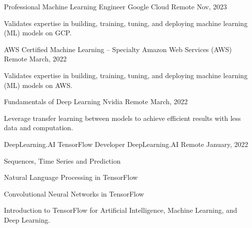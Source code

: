 

\begin{cventries}
  \cventry
  {Professional Machine Learning Engineer} %
  {Google Cloud} %
  {Remote} %
  {Nov, 2023} %
  {
    \begin{cvitems} %
      \item {Validates expertise in building, training, tuning, and deploying machine learning (ML) models on GCP.}
    \end{cvitems}
  } %
  \newline
  \cventry
  {AWS Certified Machine Learning – Specialty} %
  {Amazon Web Services (AWS)} %
  {Remote} %
  {March, 2022} %
  {
    \begin{cvitems} %
      \item {Validates expertise in building, training, tuning, and deploying machine learning (ML) models on AWS.}
    \end{cvitems}
  } %
  \newline
  \cventry
  {Fundamentals of Deep Learning} %
  {Nvidia} %
  {Remote} %
  {March, 2022} %
  {
    \begin{cvitems} %
      \item {Leverage transfer learning between models to achieve efficient results with less data and computation.}
    \end{cvitems}
  } %
  \newline
  \cventry
  {DeepLearning.AI TensorFlow Developer} %
  {DeepLearning.AI} %
  {Remote} %
  {January, 2022} %
  {
    \begin{cvitems} %
      \item {Sequences, Time Series and Prediction}
      \item {Natural Language Processing in TensorFlow}
      \item {Convolutional Neural Networks in TensorFlow}
      \item {Introduction to TensorFlow for Artificial Intelligence, Machine Learning, and Deep Learning.}
    \end{cvitems}
  }
\end{cventries}
